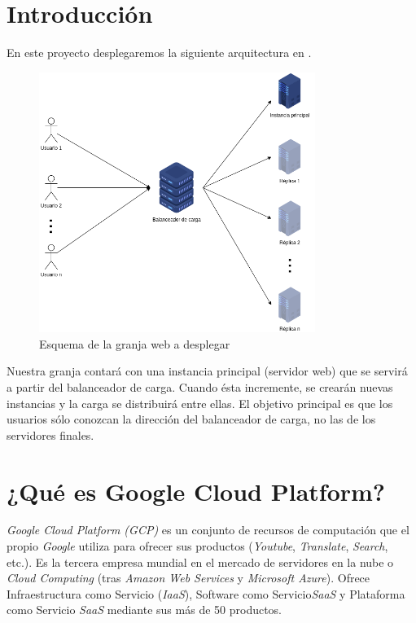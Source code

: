 \documentclass[12pt,spanish]{article}
\begin{document}
\thispagestyle{empty}
\newpage
\tableofcontents{}
\newpage


\section{Introducción}

En este proyecto desplegaremos la siguiente arquitectura en \cite{GCP}.

\begin{figure}[H]
	\centering
	\includegraphics[width=0.8\textwidth]{project/architecture.png}
	\caption{Esquema de la granja web a desplegar}
\end{figure}

Nuestra granja contará con una instancia principal (servidor web) que se servirá a partir del balanceador de carga. Cuando ésta incremente, se crearán nuevas instancias y la carga se distribuirá entre ellas. El objetivo principal es que los usuarios sólo conozcan la dirección del balanceador de carga, no las de los servidores finales.
\newpage
\section{¿Qué es Google Cloud Platform?}

\emph{Google Cloud Platform (GCP)} es un conjunto de recursos de computación que el propio \emph{Google} utiliza para ofrecer sus productos (\emph{Youtube}, \emph{Translate}, \emph{Search}, etc.). Es la tercera empresa mundial en el mercado de servidores en la nube o \emph{Cloud Computing} (tras \emph{Amazon Web Services} y \emph{Microsoft Azure}). Ofrece Infraestructura como Servicio (\emph{IaaS}), Software como Servicio\emph{SaaS} y Plataforma como Servicio \emph{SaaS} mediante sus más de 50 productos.
\end{document}
